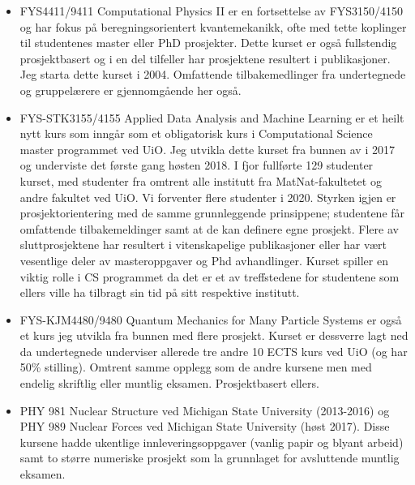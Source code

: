 \documentclass[aps,floatfix,preprint]{revtex4-1}
\begin{document}
\begin{itemize}
\item FYS4411/9411 Computational Physics II er en fortsettelse av FYS3150/4150 og har fokus på beregningsorientert kvantemekanikk, ofte med tette koplinger til studentenes master eller PhD prosjekter. Dette kurset er også fullstendig prosjektbasert og i en del tilfeller har prosjektene resultert i publikasjoner. Jeg starta dette kurset i 2004. Omfattende tilbakemedlinger fra undertegnede og gruppelærere er gjennomgående her også.


\item  FYS-STK3155/4155 Applied Data Analysis and Machine Learning er et heilt nytt kurs som  inngår som et obligatorisk kurs i Computational Science master programmet ved UiO. Jeg utvikla dette kurset fra bunnen av i 2017 og underviste det første gang høsten 2018. I fjor fullførte 129 studenter kurset, med studenter fra omtrent alle institutt fra MatNat-fakultetet og andre fakultet ved UiO. Vi forventer flere studenter i 2020. Styrken igjen er prosjektorientering med de samme grunnleggende prinsippene; studentene får omfattende tilbakemeldinger samt at de kan definere egne prosjekt. Flere av sluttprosjektene har resultert i vitenskapelige publikasjoner eller har vært vesentlige deler av masteroppgaver og Phd avhandlinger. Kurset spiller en viktig rolle i CS programmet da det er et av treffstedene for studentene som ellers ville ha tilbragt sin tid på sitt respektive institutt. 

\item FYS-KJM4480/9480 Quantum Mechanics for Many Particle Systems er også et kurs jeg utvikla fra bunnen med flere prosjekt. Kurset er dessverre lagt ned da undertegnede underviser allerede tre andre 10 ECTS kurs ved UiO (og har 50\% stilling). Omtrent samme opplegg som de andre kursene men med endelig skriftlig eller muntlig eksamen. Prosjektbasert ellers.

\item PHY 981 Nuclear Structure ved Michigan State University (2013-2016) og PHY 989 Nuclear Forces ved Michigan State University (høst 2017). Disse kursene hadde ukentlige innleveringsoppgaver (vanlig papir og blyant arbeid) samt to større numeriske prosjekt som la grunnlaget for avsluttende muntlig eksamen. 


\end{itemize}
\end{document}

